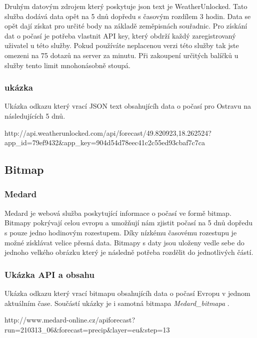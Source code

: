 \documentclass[czech,bachelor,dept460,male,csharp,cpdeclaration]{diploma}
\begin{document}
	Druhým datovým zdrojem který poskytuje json text je WeatherUnlocked. Tato služba dodává data opět na 5 dnů dopředu s časovým rozdílem 3 hodin. Data se opět dají získat pro určité body na základě zeměpisnách souřadnic. Pro získání dat o počasí je potřeba vlastnit API key, který obdrží každý zaregistrovaný uživatel u této služby. Pokud používáte neplacenou verzi této služby tak jste omezeni na 75 dotazů na server za minutu. Při zakoupení určitých balíčků u služby tento limit mnohonásobně stoupá.
	
	\subsubsection{ukázka}
	
	Ukázka odkazu který vrací JSON text obsahujícíh data o počasí pro Ostravu na následujících 5 dnů.
	
	http://api.weatherunlocked.com/api/forecast/49.820923,18.262524?app\_id=79ef9432\&app\_key=904d54d78eec41c2c55ed93cbaf7c7ca
	
	\subsection{Bitmap}
	\subsubsection{Medard}
	
	Medard je webová služba poskytující informace o počasí ve formě bitmap. Bitmapy pokrývají celou evropu a umožňují nám zjistit počasí na 5 dnů dopředu s pouze jedno hodinovým rozestupem. Díky nízkému časovému rozestupu je možné získlávat velice přesná data. Bitmapy s daty jsou uloženy vedle sebe do jednoho velkého obrázku který je následně potřeba rozdělit do jednotlivých částí.
	
	\subsubsection{Ukázka API a obsahu}
	
	Ukázka odkazu který vrací bitmapu obsahujícíh data o počasí Evropu v jednom aktuálním čase. Součástí ukázky je i samotná bitmapa \emph{Medard\_bitmapa} \cite{medard}.
	
	http://www.medard-online.cz/apiforecast?run=210313\_06\&forecast=precip\&layer=eu\&step=13
	
\end{document}
